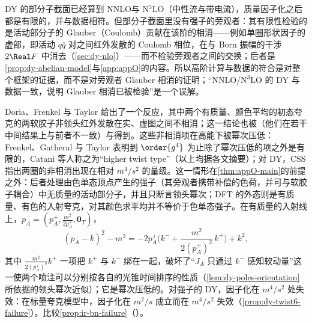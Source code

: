 \begin{remark}\label{rem:dy-nnlo-not-glauber}
DY 的部分子截面已经算到 NNLO\cite{HambergVanNeervenMatsuura1991}与 N$^3$LO（中性流\cite{Duhr:2020seh}与带电流\cite{Duhr:2020sdp}），质量因子化之后都是有限的，并与数据相符。但部分子截面里没有强子的旁观者：其有限性检验的是活动部分子的 Glauber（Coulomb）贡献在该阶的相消——例如单圈形状因子的虚部，即活动 $q\bar q$ 对之间红外发散的 Coulomb 相位，在与 Born 振幅的干涉 $2\Real F$ 中消去（\cref{sec:dy-nlo}）——而不检验旁观者之间的交换；后者是\cref{prop:dy-abelian-model}与\cref{app:appO}的内容。所以高阶计算与数据的符合是对整个框架的证据，而不是对旁观者 Glauber 相消的证明；“NNLO/N$^3$LO 的 DY 与数据一致，说明 Glauber 相消已被检验”是一个误解。
\end{remark}

\begin{remark}\label{rem:dy-dft-premises}
Doria、Frenkel 与 Taylor 给出了一个反应，其中两个有质量、颜色平均的初态夸克的两软胶子非领头红外发散在实、虚图之间不相消\cite{DoriaFrenkelTaylor1980}；这一结论也被\cite{DiLietoEtAl1981}（他们在若干中间结果上与前者不一致）与\cite{Andrasi:1980qw}得到。这些非相消项在高能下被幂次压低：Frenkel、Gatheral 与 Taylor 表明到 $\order{g^4}$ 为止除了幂次压低的项之外是有限的\cite{Frenkel:1983di}，Catani 等人称之为“higher twist type”\cite{Catani:1985xt}（以上均据各文摘要）；对 DY，CSS 指出两圈的非相消出现在相对 $m^4/s^2$ 的量级\cite[第~10.2~节]{CollinsSoperSterman1989}。这一情形在\cref{thm:appO-main}的前提之外：后者处理由色单态顶点产生的强子（其旁观者携带补偿的色荷，并可与软胶子耦合）中无质量的活动部分子，并且只断言领头幂次；DFT 的外态则是有质量、有色的入射夸克，对其颜色求平均并不等价于色单态强子。在有质量的入射线上，$p_A=(p_A^+,\frac{m^2}{2p_A^+},\mathbf 0_T)$，
\begin{equation}\label{eq:dy-dft}
(p_A-k)^2-m^2=-2p_A^+\Big(k^-+\frac{m^2}{2(p_A^+)^2}\,k^+\Big)+k^2 ,
\end{equation}
其中 $\frac{m^2}{2(p_A^+)^2}k^+$ 一项把 $k^+$ 与 $k^-$ 绑在一起，破坏了“$J_A$ 只通过 $k^-$ 感知软动量”这一使两个喷注可以分别按各自的光锥时间排序的性质（\cref{lem:dy-poles-orientation}所依据的领头幂次近似）；它是幂次压低的。对强子的 DY，因子化在 $m^4/s^2$ 处失效：在标量夸克模型中，因子化在 $m^2/s$ 成立而在 $m^4/s^2$ 失效\cite{Basu:1984ba}（\cref{prop:dy-twist6-failure}）。比较\cref{prop:ir-bn-failure}（\tagV）。
\end{remark}
